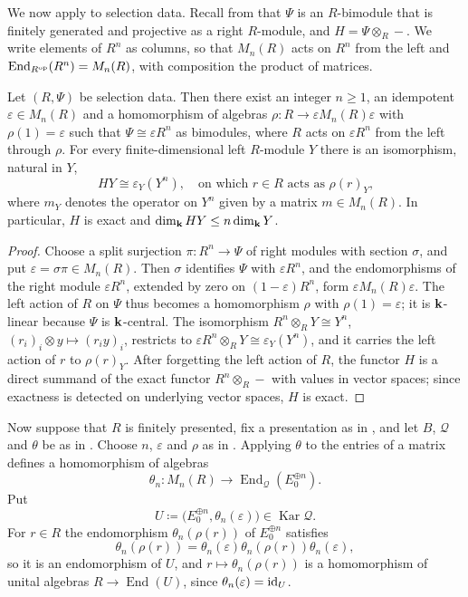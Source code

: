 We now apply  to selection data. Recall from
 that $\Psi$ is an $R$-bimodule that is finitely
generated and projective as a right $R$-module, and ${H=\Psi\otimes_R-}$. We
write elements of $R^n$ as columns, so that $M_n(R)$ acts on $R^n$ from the
left and ${\operatorname{End}_{R^{\mathrm{op}}}(R^n)=M_n(R)}$, with composition the
product of matrices.

\begin{lemma}
  \label{lemma:selection-matrix}
  Let $(R,\Psi)$ be selection data. Then there exist an integer ${n\geq1}$, an
  idempotent ${\varepsilon\in M_n(R)}$ and a homomorphism of algebras
  ${\rho\colon R\to\varepsilon M_n(R)\varepsilon}$ with ${\rho(1)=\varepsilon}$
  such that ${\Psi\cong\varepsilon R^n}$ as bimodules, where $R$ acts on
  $\varepsilon R^n$ from the left through $\rho$. For every finite-dimensional
  left $R$-module $Y$ there is an isomorphism, natural in $Y$,
  \[
    HY\cong\varepsilon_Y(Y^n),\quad\text{on which ${r\in R}$ acts as
    $\rho(r)_Y$,}
  \]
  where $m_Y$ denotes the operator on $Y^n$ given by a matrix ${m\in M_n(R)}$.
  In particular, $H$ is exact and ${\dim_{\mathbf{k}} HY\leq n\dim_{\mathbf{k}} Y}$.
\end{lemma}

\begin{proof}
  Choose a split surjection ${\pi\colon R^n\to\Psi}$ of right modules with
  section $\sigma$, and put ${\varepsilon=\sigma\pi\in M_n(R)}$. Then $\sigma$
  identifies $\Psi$ with $\varepsilon R^n$, and the endomorphisms of the right
  module $\varepsilon R^n$, extended by zero on ${(1-\varepsilon)R^n}$, form
  $\varepsilon M_n(R)\varepsilon$. The left action of $R$ on $\Psi$ thus
  becomes a homomorphism $\rho$ with ${\rho(1)=\varepsilon}$; it is
  $\mathbf{k}$-linear because $\Psi$ is $\mathbf{k}$-central. The isomorphism
  ${R^n\otimes_RY\cong Y^n}$, ${(r_i)_i\otimes y\mapsto(r_iy)_i}$, restricts to
  ${\varepsilon R^n\otimes_RY\cong\varepsilon_Y(Y^n)}$, and it carries the left
  action of $r$ to $\rho(r)_Y$. After forgetting the left action of $R$, the
  functor $H$ is a direct summand of the exact functor ${R^n\otimes_R-}$ with
  values in vector spaces; since exactness is detected on underlying vector
  spaces, $H$ is exact.
\end{proof}

Now suppose that $R$ is finitely presented, fix a presentation as in
, and let $B$, $\mathcal{Q}$ and $\theta$ be as in
. Choose $n$, $\varepsilon$ and $\rho$ as in
. Applying $\theta$ to the entries of a matrix
defines a homomorphism of algebras
\[
  \theta_n\colon
  M_n(R)\longrightarrow\operatorname{End}_{\mathcal{Q}}(E_0^{\oplus n}).
\]
Put
\[
  U\coloneqq\bigl(E_0^{\oplus n},\theta_n(\varepsilon)\bigr)\in
  \operatorname{Kar}\mathcal{Q}.
\]
For ${r\in R}$ the endomorphism $\theta_n(\rho(r))$ of $E_0^{\oplus n}$
satisfies
\[
  \theta_n(\rho(r))=\theta_n(\varepsilon)\theta_n(\rho(r))
  \theta_n(\varepsilon),
\]
so it is an endomorphism of $U$, and
${r\mapsto\theta_n(\rho(r))}$ is a homomorphism of unital algebras
${R\to\operatorname{End}(U)}$, since ${\theta_n(\varepsilon)=\id[U]}$.


